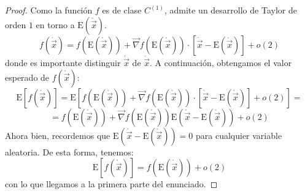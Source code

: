 \documentclass[11pt,a4paper,spanish]{article}
\numberwithin{equation}{section}
\numberwithin{table}{section}
\numberwithin{figure}{section}
\theoremstyle{definition}
\theoremstyle{remark}
\theoremstyle{definition}
\theoremstyle{remark}
\theoremstyle{plain}
\theoremstyle{plain}
\theoremstyle{plain}
\theoremstyle{plain}
\theoremstyle{plain}
\theoremstyle{plain}
\begin{document}
	\begin{proof}
		Como la función $f$ es de clase $C^{\left(1\right)}$, admite un
		desarrollo de Taylor de orden $1$ en torno a $\mathrm{E}\left(\mathring{\vec{x}}\right)$.
		\begin{equation}
			f\left(\dot{\vec{x}}\right)=f\left(\mathrm{E}\left(\mathring{\vec{x}}\right)\right)+\vec{\nabla}f\left(\mathrm{E}\left(\mathring{\vec{x}}\right)\right)\cdot\left[\dot{\vec{x}}-\mathrm{E}\left(\mathring{\vec{x}}\right)\right]+o\left(2\right)\label{eq:f primer orden}
		\end{equation}
		donde es importante distinguir $\dot{\vec{x}}$ de $\mathring{\vec{x}}$.
		A continuación, obtengamos el valor esperado de $f\left(\mathring{\vec{x}}\right)$:
		\[
		\mathrm{E}\left[f\left(\mathring{\vec{x}}\right)\right]=\mathrm{E}\left[f\left(\mathrm{E}\left(\mathring{\vec{x}}\right)\right)+\vec{\nabla}f\left(\mathrm{E}\left(\mathring{\vec{x}}\right)\right)\cdot\left[\mathring{\vec{x}}-\mathrm{E}\left(\mathring{\vec{x}}\right)\right]+o\left(2\right)\right]=
		\]
		\[
		=f\left(\mathrm{E}\left(\mathring{\vec{x}}\right)\right)+\vec{\nabla}f\left(\mathrm{E}\left(\mathring{\vec{x}}\right)\right)\mathrm{E}\left(\mathring{\vec{x}}-\mathrm{E}\left(\mathring{\vec{x}}\right)\right)+o\left(2\right)
		\]
		Ahora bien, recordemos que $\mathrm{E}\left(\mathring{\vec{x}}-\mathrm{E}\left(\mathring{\vec{x}}\right)\right)=0$
		para cualquier variable aleatoria. De esta forma, tenemos:
		\[
		\mathrm{E}\left[f\left(\mathring{\vec{x}}\right)\right]=f\left(\mathrm{E}\left(\mathring{\vec{x}}\right)\right)+o\left(2\right)
		\]
		con lo que llegamos a la primera parte del enunciado.
		

\end{proof}
\end{document}
